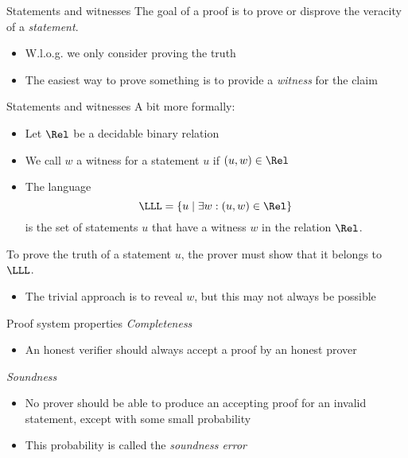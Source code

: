 \begin{frame}{Statements and witnesses}
  \pause
  The goal of a proof is to prove or disprove the veracity of a \emph{statement}.
  \begin{itemize}[<+(1)->]
    \item W.l.o.g. we only consider proving the truth
    \item The easiest way to prove something is to provide a \emph{witness} for the claim
  \end{itemize}
\end{frame}

\begin{frame}{Statements and witnesses}
  A bit more formally:
  \begin{itemize}[<+(1)->]
    \item Let $\Rel$ be a decidable binary relation
    \item We call $w$ a witness for a statement $u$ if $(u, w) \in \Rel$
    \item The language
    \[
      \LLL = \{u \mid \exists w : (u, w) \in \Rel\}
    \]
    is the set of statements $u$ that have a witness $w$ in the relation $\Rel$.
  \end{itemize}

  \vfill

  \pause
  To prove the truth of a statement $u$, the prover must show that it belongs to $\LLL$.
  \begin{itemize}[<+(1)->]
    \item The trivial approach is to reveal $w$, but this may not always be possible
  \end{itemize}
\end{frame}

\begin{frame}{Proof system properties}
  \pause
  \emph{Completeness}
  \begin{itemize}[<+(1)->]
    \item An honest verifier should always accept a proof by an honest prover
  \end{itemize}

  \vspace*{1em}

  \pause
  \emph{Soundness}
  \begin{itemize}[<+(1)->]
    \item No prover should be able to produce an accepting proof for an invalid statement, except with some small probability
    \item This probability is called the \emph{soundness error}
  \end{itemize}
\end{frame}

